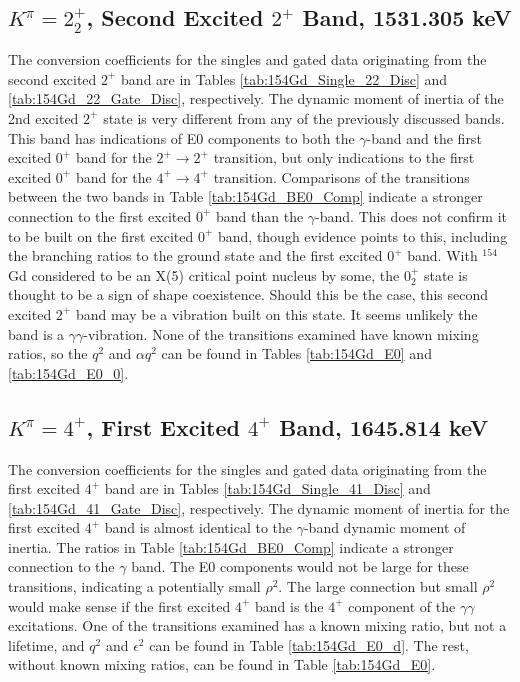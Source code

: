 



\subsection{$K^{\pi}=2^+_2$, Second Excited $2^+$ Band, 1531.305 keV}

The conversion coefficients for the singles and gated data originating from the second excited $2^+$ band are in Tables \ref{tab:154Gd_Single_22_Disc} and \ref{tab:154Gd_22_Gate_Disc}, respectively. The dynamic moment of inertia of the 2nd excited $2^+$ state is very different from any of the previously discussed bands. This band has indications of E0 components to both the $\gamma$-band and the first excited $0^+$ band for the $2^+\rightarrow2^+$ transition, but only indications to the first excited $0^+$ band for the $4^+\rightarrow4^+$ transition. Comparisons of the transitions between the two bands in Table \ref{tab:154Gd_BE0_Comp} indicate a stronger connection to the first excited $0^+$ band than the $\gamma$-band. This does not confirm it to be built on the first excited $0^+$ band, though evidence points to this, including the branching ratios to the ground state and the first excited $0^+$ band.  With $^{154}$Gd considered to be an X(5) critical point nucleus by some, the $0^+_2$ state is thought to be a sign of shape coexistence. Should this be the case, this second excited $2^+$ band may be a vibration built on this state. It seems unlikely the band is a $\gamma\gamma$-vibration. None of the transitions examined have known mixing ratios, so the $q^2$ and $\alpha q^2$ can be found in Tables \ref{tab:154Gd_E0} and \ref{tab:154Gd_E0_0}.





\subsection{$K^{\pi}=4^+$, First Excited $4^+$ Band, 1645.814 keV}

The conversion coefficients for the singles and gated data originating from the first excited $4^+$ band are in Tables \ref{tab:154Gd_Single_41_Disc} and \ref{tab:154Gd_41_Gate_Disc}, respectively. The dynamic moment of inertia for the first excited $4^+$ band is almost identical to the $\gamma$-band dynamic moment of inertia. The ratios in Table \ref{tab:154Gd_BE0_Comp} indicate a stronger connection to the $\gamma$ band. The E0 components would not be large for these transitions, indicating a potentially small $\rho^2$. The large connection but small $\rho^2$ would make sense if the first excited $4^+$ band is the $4^+$ component of the $\gamma\gamma$ excitations. One of the transitions examined has a known mixing ratio, but not a lifetime, and $q^2$ and $\epsilon^2$ can be found in Table \ref{tab:154Gd_E0_d}. The rest, without known mixing ratios, can be found in Table \ref{tab:154Gd_E0}.

